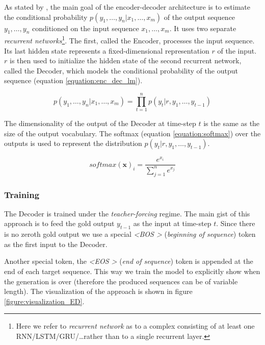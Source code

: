 As stated by \citep{sutskever2014sequence}, the main goal of the encoder-decoder architecture is to estimate the conditional probability $p(y_1,\dots,y_n | x_1,\dots,x_m)$ of the output sequence $y_1,\dots,y_n$ conditioned on the input sequence $x_1,\dots,x_m$. It uses two separate \emph{recurrent networks}\footnote{Here we refer to \emph{recurrent network} as to a complex consisting of at least one RNN/LSTM/GRU/\dots rather than to a single recurrent layer.}. The first, called the Encoder, processes the input sequence. Its last hidden state represents a fixed-dimensional representation $r$ of the input. $r$ is then used to initialize the hidden state of the second recurrent network, called the Decoder, which models the conditional probability of the output sequence (equation \ref{equation:enc_dec_lm}).

\begin{equation} \label{equation:enc_dec_lm}
    p(y_1,\dots, y_n | x_1,\dots, x_m) = \prod_{t=1}^n{p(y_t | r, y_1, \dots, y_{t-1})}
\end{equation}

The dimensionality of the output of the Decoder at time-step $t$ is the same as the size of the output vocabulary. The softmax (equation \ref{equation:softmax}) over the outputs is used to represent the distribution $p(y_t | r, y_1, \dots, y_{t-1})$.

\begin{equation} \label{equation:softmax}
    softmax(\boldsymbol{x})_i = \frac{e^{x_i}}{\sum_{j=1}^n{e^{x_j}}}
\end{equation}

\subsubsection{Training}

The Decoder is trained under the \emph{teacher-forcing} regime. The main gist of this approach is to feed the gold output $y_{t-1}$ as the input at time-step $t$. Since there is no zeroth gold output we use a special \emph{\textless BOS \textgreater} (\emph{beginning of sequence}) token as the first input to the Decoder.

Another special token, the \emph{\textless EOS \textgreater} (\emph{end of sequence}) token is appended at the end of each target sequence. This way we train the model to explicitly show when the generation is over (therefore the produced sequences can be of variable length). The visualization of the approach is shown in figure \ref{figure:visualization_ED}.

